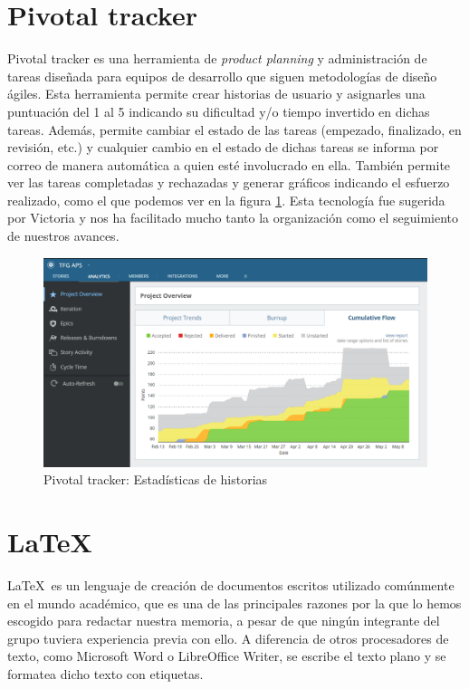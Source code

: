 \documentclass[11pt]{book}
\begin{document}
	\section{Pivotal tracker}
	Pivotal tracker es una herramienta de \emph{product planning} y administración de tareas diseñada para equipos de desarrollo que siguen metodologías de diseño ágiles.
	Esta herramienta permite crear historias de usuario y asignarles una puntuación del 1 al 5 indicando su dificultad y/o tiempo invertido en dichas tareas. Además, permite cambiar el estado de las tareas (empezado, finalizado, en revisión, etc.) y cualquier cambio en el estado de dichas tareas se informa por correo de manera automática a quien esté involucrado en ella.
	También permite ver las tareas completadas y rechazadas y generar gráficos indicando el esfuerzo realizado, como el que podemos ver en la figura \ref{Figura 2}. Esta tecnología fue sugerida por Victoria y nos ha facilitado mucho tanto la organización como el seguimiento de nuestros avances.
	
	\begin{figure}
		\centering
		\includegraphics[scale=0.6]{pivotal}
		\caption{Pivotal tracker: Estadísticas de historias}
		\label{Figura 2}
	\end{figure}
	
	\section{\LaTeX}
	\LaTeX\ es un lenguaje de creación de documentos escritos utilizado comúnmente en el mundo académico, que es una de las principales razones por la que lo hemos escogido para redactar nuestra memoria, a pesar de que ningún integrante del grupo tuviera experiencia previa con ello. A diferencia de otros procesadores de texto, como Microsoft Word o LibreOffice Writer, se escribe el texto plano y se formatea dicho texto con etiquetas. 
	
\end{document}
